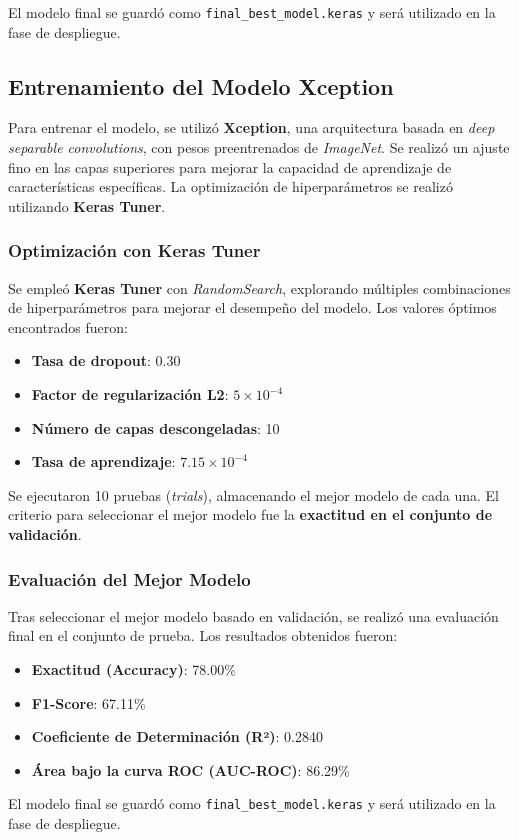 El modelo final se guardó como \texttt{final\_best\_model.keras} y será utilizado
en la fase de despliegue.

\subsection{Entrenamiento del Modelo Xception}

Para entrenar el modelo, se utilizó \textbf{Xception}, una arquitectura basada en
\textit{deep separable convolutions}, con pesos preentrenados de \textit{ImageNet}.
Se realizó un ajuste fino en las capas superiores para mejorar la capacidad de
aprendizaje de características específicas. La optimización de hiperparámetros se
realizó utilizando \textbf{Keras Tuner}.

\subsubsection{Optimización con Keras Tuner}
Se empleó \textbf{Keras Tuner} con \textit{RandomSearch}, explorando múltiples combinaciones
de hiperparámetros para mejorar el desempeño del modelo. Los valores óptimos encontrados fueron:

\begin{itemize}
    \item \textbf{Tasa de dropout}: 0.30
    \item \textbf{Factor de regularización L2}: $5 \times 10^{-4}$
    \item \textbf{Número de capas descongeladas}: 10
    \item \textbf{Tasa de aprendizaje}: $7.15 \times 10^{-4}$
\end{itemize}

Se ejecutaron 10 pruebas (\textit{trials}), almacenando el mejor modelo de cada una.
El criterio para seleccionar el mejor modelo fue la \textbf{exactitud en el conjunto de validación}.

\subsubsection{Evaluación del Mejor Modelo}

Tras seleccionar el mejor modelo basado en validación, se realizó una evaluación final en el conjunto de prueba.
Los resultados obtenidos fueron:

\begin{itemize}
    \item \textbf{Exactitud (Accuracy)}: 78.00\%
    \item \textbf{F1-Score}: 67.11\%
    \item \textbf{Coeficiente de Determinación (R²)}: 0.2840
    \item \textbf{Área bajo la curva ROC (AUC-ROC)}: 86.29\%
\end{itemize}

El modelo final se guardó como \texttt{final\_best\_model.keras} y será utilizado en la fase de despliegue.


